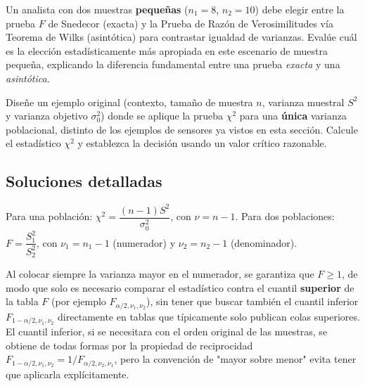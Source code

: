 \begin{problema}
	\label{prob:9db6e94}
	Un analista con dos muestras \textbf{pequeñas} ($n_1=8$, $n_2=10$) debe elegir entre la prueba $F$ de Snedecor (exacta) y la Prueba de Razón de Verosimilitudes vía Teorema de Wilks (asintótica) para contrastar igualdad de varianzas. Evalúe cuál es la elección estadísticamente más apropiada en este escenario de muestra pequeña, explicando la diferencia fundamental entre una prueba \emph{exacta} y una \emph{asintótica}.
\end{problema}

\begin{problema}
	\label{prob:a0ad324}
	Diseñe un ejemplo original (contexto, tamaño de muestra $n$, varianza muestral $S^2$ y varianza objetivo $\sigma_0^2$) donde se aplique la prueba $\chi^2$ para una \textbf{única} varianza poblacional, distinto de los ejemplos de sensores ya vistos en esta sección. Calcule el estadístico $\chi^2$ y establezca la decisión usando un valor crítico razonable.
\end{problema}

\subsection*{Soluciones detalladas}

\begin{solproblema}[prob:246a30e]
	Para una población: $\chi^2 = \dfrac{(n-1)S^2}{\sigma_0^2}$, con $\nu=n-1$. Para dos poblaciones: $F = \dfrac{S_1^2}{S_2^2}$, con $\nu_1=n_1-1$ (numerador) y $\nu_2=n_2-1$ (denominador).
\end{solproblema}

\begin{solproblema}
	Al colocar siempre la varianza mayor en el numerador, se garantiza que $F\ge1$, de modo que solo es necesario comparar el estadístico contra el cuantil \textbf{superior} de la tabla $F$ (por ejemplo $F_{\alpha/2,\nu_1,\nu_2}$), sin tener que buscar también el cuantil inferior $F_{1-\alpha/2,\nu_1,\nu_2}$ directamente en tablas que típicamente solo publican colas superiores. El cuantil inferior, si se necesitara con el orden original de las muestras, se obtiene de todas formas por la propiedad de reciprocidad $F_{1-\alpha/2,\nu_1,\nu_2}=1/F_{\alpha/2,\nu_2,\nu_1}$, pero la convención de "mayor sobre menor" evita tener que aplicarla explícitamente.
\end{solproblema}

